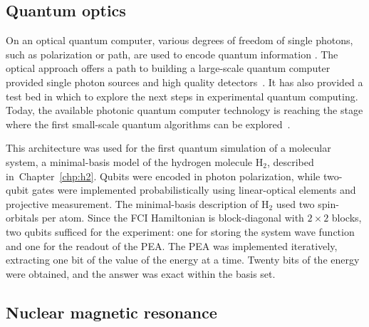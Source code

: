 \documentclass[11pt,oneside,final]{huthesis}%
\begin{document}
\subsection*{Quantum optics}

On an optical quantum computer, various degrees of freedom of single photons,
such as polarization or path, are used to encode quantum information
\cite{OBrien07,Kok07}. 
The optical approach offers a path to building a
large-scale quantum computer provided single photon sources and high quality detectors~\cite{Knill01, Kok07}. 
It has also provided a test bed
in which to explore the next steps in experimental quantum computing.
Today, the available photonic quantum computer technology
is reaching the stage where the first small-scale quantum
algorithms can be explored~\cite{Lanyon07, Lanyon09}.

This architecture was used for the first quantum
simulation of a molecular system, a minimal-basis model of the hydrogen molecule
H$_2$, described in~Chapter~\ref{chp:h2}.  Qubits were encoded in photon polarization, while
two-qubit gates were implemented probabilistically using linear-optical elements
and projective measurement. The minimal-basis description of H$_2$ used two
spin-orbitals per atom. Since the FCI Hamiltonian is block-diagonal with
$2\times 2$ blocks, two qubits sufficed for the experiment: one for storing the
system wave function and one for the readout of the PEA. The PEA was implemented
iteratively, extracting one bit of the value of the energy at a time. Twenty
bits of the energy were obtained, and the answer was exact within the basis set.

\subsection*{Nuclear magnetic resonance}
\end{document}
